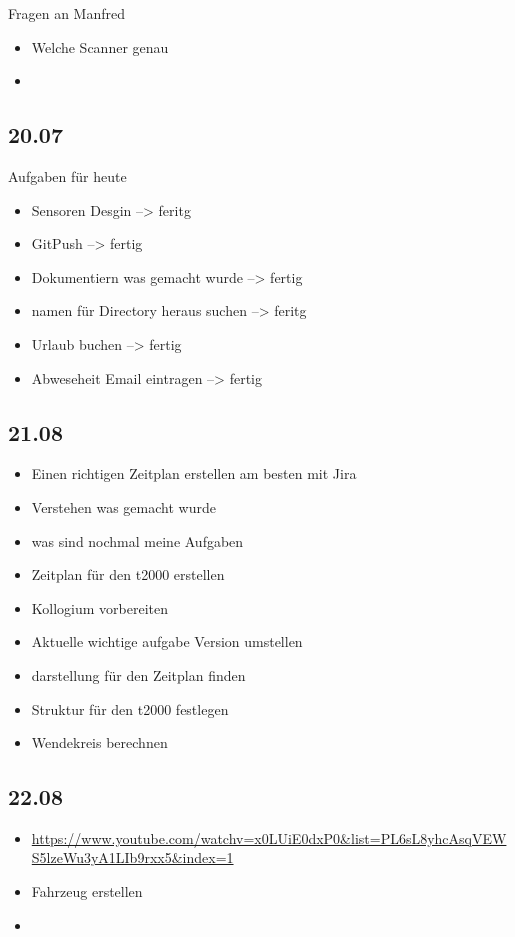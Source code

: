 Fragen an Manfred
\begin{itemize}
\item Welche Scanner genau
\item 
\end{itemize}


\subsection{20.07}

Aufgaben für heute
\begin{itemize}
\item Sensoren Desgin --> feritg
\item GitPush --> fertig
\item Dokumentiern was gemacht wurde --> fertig
\item namen für Directory heraus suchen --> feritg
\item Urlaub buchen --> fertig
\item Abweseheit Email eintragen --> fertig


\end{itemize}

\subsection{21.08}
\begin{itemize}
\item Einen richtigen Zeitplan erstellen am besten mit Jira
\item Verstehen was gemacht wurde
\item was sind nochmal meine Aufgaben
\item Zeitplan für den t2000 erstellen 
\item Kollogium vorbereiten 
\item Aktuelle wichtige aufgabe Version umstellen
\item darstellung für den Zeitplan finden
\item Struktur für den t2000 festlegen
\item Wendekreis berechnen
\end{itemize}

\subsection{22.08}
\begin{itemize}
\item \url{https://www.youtube.com/watchv=x0LUiE0dxP0&list=PL6sL8yhcAsqVEWS5lzeWu3yA1LIb9rxx5&index=1}
\item Fahrzeug erstellen
\item 
\end{itemize}
